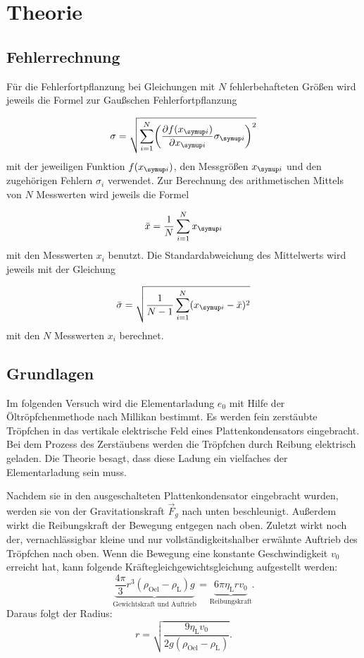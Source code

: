 \section{Theorie}
\label{sec:Theorie}

\subsection{Fehlerrechnung}

Für die Fehlerfortpflanzung bei Gleichungen mit $N$ fehlerbehafteten Größen
wird jeweils die Formel zur Gaußschen Fehlerfortpflanzung

\begin{equation*}
  \sigma = \sqrt{\sum_{i=1}^{N}\biggl(\frac{\partial f(x_{\g{i}})}{\partial x_{\g{i}}}
  \sigma_{\g{i}}\biggr)^2}
\end{equation*}
mit der jeweiligen Funktion $f(x_{\g{i}})$, den Messgrößen $x_{\g{i}}$ und den
zugehörigen Fehlern $\sigma_i$ verwendet.
Zur Berechnung des arithmetischen Mittels von $N$ Messwerten wird jeweils die
Formel

\begin{equation*}
  \bar{x} = \frac{1}{N}\sum_{i=1}^{N}x_{\g{i}}
\end{equation*}
mit den Messwerten $x_i$ benutzt.
Die Standardabweichung des Mittelwerts wird jeweils mit der Gleichung

\begin{equation*}
  \bar{\sigma} = \sqrt{\frac{1}{N-1}\sum_{i=1}^{N}(x_{\g{i}} - \bar{x})^2}
\end{equation*}
mit den $N$ Messwerten $x_i$ berechnet.

\subsection{Grundlagen}

Im folgenden Versuch wird die Elementarladung $e_0$ mit Hilfe
der Öltröpfchenmethode nach Millikan bestimmt.
Es werden fein zerstäubte Tröpfchen in das vertikale elektrische
Feld eines Plattenkondensators eingebracht. Bei dem Prozess des
Zerstäubens werden die Tröpfchen durch Reibung elektrisch geladen.
Die Theorie besagt, dass diese Ladung ein vielfaches der Elementarladung
sein muss.

Nachdem sie in den ausgeschalteten Plattenkondensator eingebracht
wurden, werden sie von der Gravitationskraft $\vec{F}_g$ nach unten beschleunigt.
Außerdem wirkt die Reibungskraft der Bewegung entgegen nach oben. Zuletzt
wirkt noch der, vernachlässigbar kleine und nur vollständigkeitshalber
erwähnte Auftrieb des Tröpfchen nach oben. Wenn die Bewegung eine konstante
Geschwindigkeit $v_0$ erreicht hat, kann folgende
Kräftegleichgewichtsgleichung aufgestellt werden:
\begin{equation}
  \underbrace{\frac{4\pi}{3} r^3 (\rho_\text{Oel}-\rho_\text{L})g}_\text{Gewichtskraft und Auftrieb}
   = \underbrace{6 \pi \eta_\text{L} r v_0}_\text{Reibungskraft}.
\end{equation}
Daraus folgt der Radius:
\begin{equation}
  r = \sqrt{\frac{9 \eta_\text{L} v_0}{2 g (\rho_\text{Oel}-\rho_\text{L})}}.
\end{equation}

